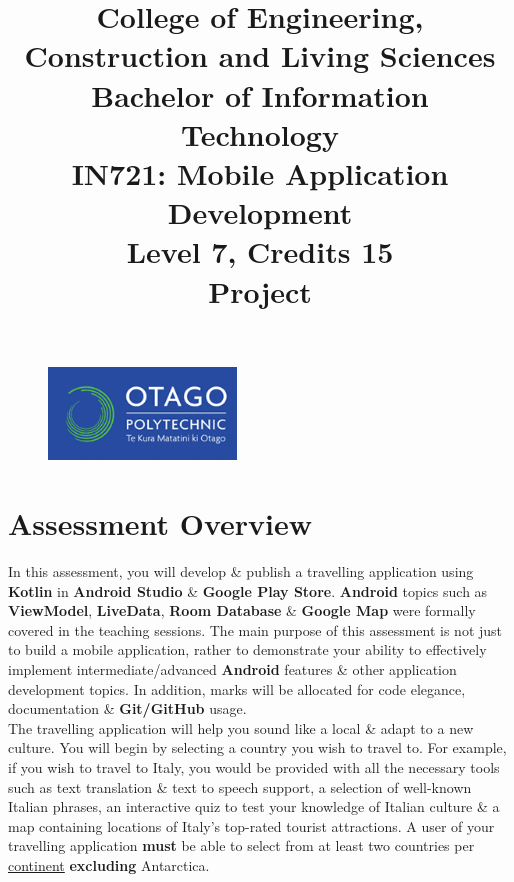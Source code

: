 \documentclass{article}
\author{}
\begin{document}
\begin{figure}
	\centering
	\includegraphics[width=50mm]{../../resources/img/logo.png}
\end{figure}

\title{College of Engineering, Construction and Living Sciences\\Bachelor of Information Technology\\IN721: Mobile Application Development\\Level 7, Credits 15\\\textbf{Project}}
\date{}
\maketitle

\section*{Assessment Overview}
In this assessment, you will develop \& publish a travelling application using \textbf{Kotlin} in \textbf{Android Studio} \& \textbf{Google Play Store}. \textbf{Android} topics such as \textbf{ViewModel}, \textbf{LiveData}, \textbf{Room Database} \& \textbf{Google Map} were formally covered in the teaching sessions. The main purpose of this assessment is not just to build a mobile application, rather to demonstrate your ability to effectively implement intermediate/advanced \textbf{Android} features \& other application development topics. In addition, marks will be allocated for code elegance, documentation \& \textbf{Git/GitHub} usage. \\

The travelling application will help you sound like a local \& adapt to a new culture. You will begin by selecting a country you wish to travel to. For example, if you wish to travel to Italy, you would be provided with all the necessary tools such as text translation \& text to speech support, a selection of well-known Italian phrases, an interactive quiz to test your knowledge of Italian culture \& a map containing locations of Italy's top-rated tourist attractions. A user of your travelling application \textbf{must} be able to select from at least two countries per \href{https://www.worldometers.info/geography/7-continents/}{continent} \textbf{excluding} Antarctica. 
\end{document}
